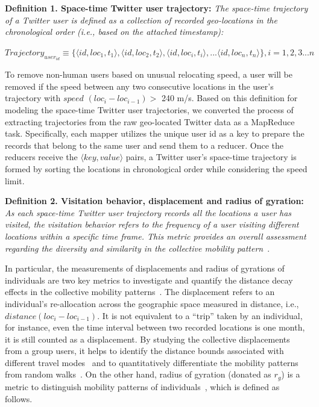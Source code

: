\documentclass[ijgi,article,accept,moreauthors,pdftex,10pt,a4paper]{mdpi}
\theoremstyle{mdpi}
\newcounter{ex}
\newcounter{re}
\theoremstyle{mdpidefinition}
\begin{document}
\noindent\textbf{Definition 1. Space-time Twitter user trajectory:} \emph{The space-time trajectory of a Twitter user is defined as a collection of recorded geo-locations in the chronological order (i.e., based on the attached timestamp):} 
\newline

$Trajectory_{user_{id}} \equiv \lbrace \langle id, loc_{1}, t_{1}\rangle, \langle id, loc_{2}, t_{2}\rangle, \langle id, loc_{i}, t_{i}\rangle, ... \langle id, loc_{n}, t_{n}\rangle \rbrace, i = 1, 2, 3...n$
\newline

To remove non-human users based on unusual relocating speed, a user will be removed if the speed between any two consecutive locations in the user's trajectory with $speed$ $(loc_{i} - loc_{i-1}) > $ 240 m/s.
Based on this definition for modeling the space-time Twitter user trajectories, we converted the process of extracting trajectories from the raw geo-located Twitter data as a MapReduce task. Specifically, each mapper utilizes the unique user id as a key to prepare the records that belong to the same user and send them to a reducer. Once the reducers receive the $\langle key, value\rangle$ pairs, a Twitter user's space-time trajectory is formed by sorting the locations in chronological order while considering the speed limit.
\newline

\noindent\textbf{Definition 2. Visitation behavior, displacement and radius of gyration:} \emph{As each space-time Twitter user trajectory records all the locations a user has visited, the visitation behavior refers to the frequency of a user visiting different locations within a specific time frame.
This metric provides an overall assessment regarding the diversity and similarity in the collective mobility pattern}~\cite{gao2012exploring}.

In particular, the measurements of displacements and radius of gyrations of individuals are two key metrics to investigate and quantify the distance decay effects in the collective mobility patterns~\cite{gonzalez2008understanding}.
The displacement refers to an individual's re-allocation across the geographic space measured in distance, i.e., $distance (loc_{i} - loc_{i-1})$.
It is not equivalent to a ``trip'' taken by an individual, for instance, even the time interval between two recorded locations is one month, it is still counted as a displacement.
By studying the collective displacements from a group users, it helps to identify the distance bounds associated with different travel modes~\cite{Jurdak2015} and to quantitatively differentiate the mobility patterns from random walks~\cite{brockmann2006scaling}.
On the other hand, radius of gyration (donated as $r_{g}$) is a metric to distinguish mobility patterns of individuals~\cite{gonzalez2008understanding}, which is defined as follows.
\newline
\end{document}
